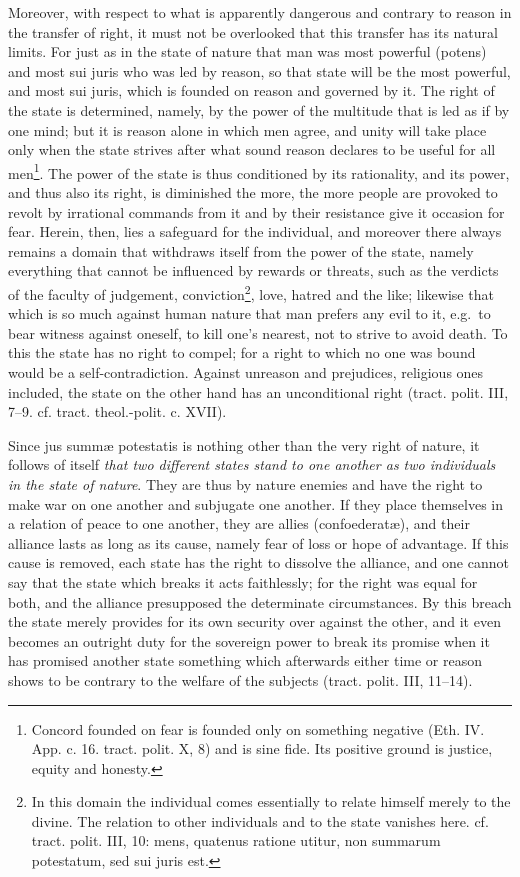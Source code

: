 \documentclass[12pt,a4paper,openany]{book}
\newcommand{\opage}[1]{\marginnote{\footnotesize\textit{[#1]}}}
\begin{document}
Moreover, with respect to what is apparently dangerous and contrary to reason in the transfer of right, it must not be overlooked that this transfer has its natural limits. For just as in the state of nature that man was most powerful (potens) and most sui juris who was led by reason, so that state will be the most powerful, and most sui juris, which is founded on reason and governed by it. The right of the state is determined, namely, by the power of the multitude that is led as if by one mind; but it is reason alone in which men agree, and unity will take place only when the state strives after what sound reason declares to be useful for all men\footnote{Concord founded on fear is founded only on something negative (Eth. IV. App. c. 16. tract. polit. X, 8) and is sine fide. Its positive ground is justice, equity and honesty.}. The power of the state is thus conditioned by its rationality, and its power, and thus also its right, is diminished the more, the more people are provoked to revolt by irrational commands from it and by their resistance give it occasion for fear. Herein, then, lies a safeguard for the individual, and moreover there always remains a domain that withdraws itself from the power of the state, namely everything that cannot be influenced by rewards or threats, such as the verdicts of the faculty of judgement, conviction\footnote{In this domain the individual comes essentially to relate himself merely to the divine. The relation to other individuals and to the state vanishes here. cf. tract. polit. III, 10: mens, quatenus ratione utitur, non summarum potestatum, sed sui juris est.}, love, hatred and the like; likewise that which is so much against human nature that man prefers any evil to it, e.g.\ to bear witness against oneself, to kill one's nearest, not to strive to avoid death. To this the state has no right to compel; for a right to which no one was
\opage{141}bound would be a self-contradiction. Against unreason and prejudices, religious ones included, the state on the other hand has an unconditional right (tract. polit. III, 7--9. cf. tract. theol.-polit. c. XVII).

Since jus summæ potestatis is nothing other than the very right of nature, it follows of itself \emph{that two different states stand to one another as two individuals in the state of nature}. They are thus by nature enemies and have the right to make war on one another and subjugate one another. If they place themselves in a relation of peace to one another, they are allies (confoederatæ), and their alliance lasts as long as its cause, namely fear of loss or hope of advantage. If this cause is removed, each state has the right to dissolve the alliance, and one cannot say that the state which breaks it acts faithlessly; for the right was equal for both, and the alliance presupposed the determinate circumstances. By this breach the state merely provides for its own security over against the other, and it even becomes an outright duty for the sovereign power to break its promise when it has promised another state something which afterwards either time or reason shows to be contrary to the welfare of the subjects (tract. polit. III, 11--14).
\end{document}
